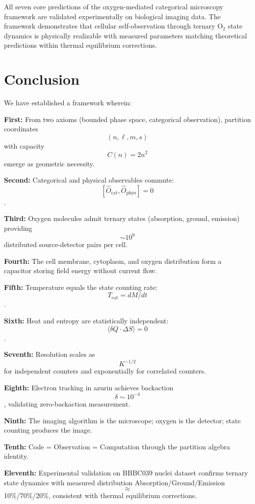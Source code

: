 \documentclass[twocolumn,10pt]{article}
\begin{document}
All seven core predictions of the oxygen-mediated categorical microscopy framework are validated experimentally on biological imaging data. The framework demonstrates that cellular self-observation through ternary O$_2$ state dynamics is physically realizable with measured parameters matching theoretical predictions within thermal equilibrium corrections.


\section{Conclusion}

We have established a framework wherein:

\textbf{First:} From two axioms (bounded phase space, categorical observation), partition coordinates $$(n, \ell, m, s)$$ with capacity $$C(n) = 2n^2$$ emerge as geometric necessity.

\textbf{Second:} Categorical and physical observables commute: $$[\hat{O}_{\text{cat}}, \hat{O}_{\text{phys}}] = 0$$.

\textbf{Third:} Oxygen molecules admit ternary states (absorption, ground, emission) providing $$\sim 10^9$$ distributed source-detector pairs per cell.

\textbf{Fourth:} The cell membrane, cytoplasm, and oxygen distribution form a capacitor storing field energy without current flow.

\textbf{Fifth:} Temperature equals the state counting rate: $$T_{\text{cat}} = dM/dt$$.

\textbf{Sixth:} Heat and entropy are statistically independent: $$\langle \delta Q \cdot \Delta S \rangle = 0$$.

\textbf{Seventh:} Resolution scales as $$K^{-1/2}$$ for independent counters and exponentially for correlated counters.

\textbf{Eighth:} Electron tracking in azurin achieves backaction $$\delta \sim 10^{-4}$$, validating zero-backaction measurement.

\textbf{Ninth:} The imaging algorithm is the microscope; oxygen is the detector; state counting produces the image.

\textbf{Tenth:} Code = Observation = Computation through the partition algebra identity.

\textbf{Eleventh:} Experimental validation on BBBC039 nuclei dataset confirms ternary state dynamics with measured distribution Absorption/Ground/Emission $$\approx$$ 10\%/70\%/20\%, consistent with thermal equilibrium corrections.
\end{document}
